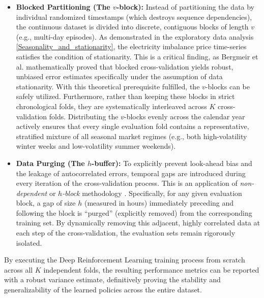 \begin{itemize}
    \item \textbf{Blocked Partitioning (The $v$-block):} Instead of partitioning the data by individual randomized timestamps (which destroys sequence dependencies), the continuous dataset is divided into discrete, contiguous blocks of length $v$ (e.g., multi-day episodes). As demonstrated in the exploratory data analysis \ref{Seasonality_and_stationarity}, the electricity imbalance price time-series satisfies the condition of stationarity. This is a critical finding, as Bergmeir et al. \cite{BERGMEIR2012192} mathematically proved that blocked cross-validation yields robust, unbiased error estimates specifically under the assumption of data stationarity. With this theoretical prerequisite fulfilled, the $v$-blocks can be safely utilized. Furthermore, rather than keeping these blocks in strict chronological folds, they are systematically interleaved across $K$ cross-validation folds. Distributing the $v$-blocks evenly across the calendar year actively ensures that every single evaluation fold contains a representative, stratified mixture of all seasonal market regimes (e.g., both high-volatility winter weeks and low-volatility summer weekends).
    
    \item \textbf{Data Purging (The $h$-buffer):} To explicitly prevent look-ahead bias and the leakage of autocorrelated errors, temporal gaps are introduced during every iteration of the cross-validation process. This is an application of \textit{non-dependent} or \textit{$h$-block} methodology \cite{BERGMEIR2012192}. Specifically, for any given evaluation block, a gap of size $h$ (measured in hours) immediately preceding and following the block is ``purged'' (explicitly removed) from the corresponding training set. By dynamically removing this adjacent, highly correlated data at each step of the cross-validation, the evaluation sets remain rigorously isolated.
\end{itemize}

By executing the Deep Reinforcement Learning training process from scratch across all $K$ independent folds, the resulting performance metrics can be reported with a robust variance estimate, definitively proving the stability and generalizability of the learned policies across the entire dataset.

